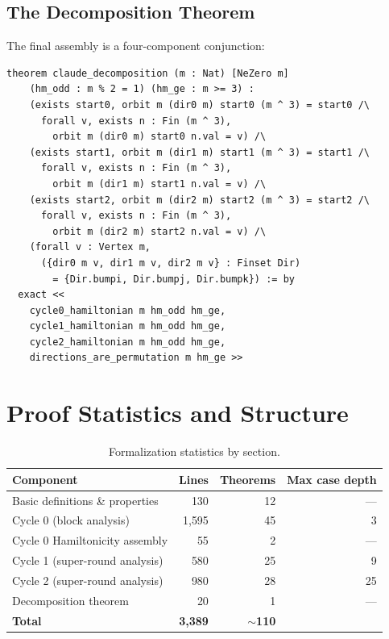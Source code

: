 \documentclass[11pt,a4paper]{article}
\begin{document}
\subsection{The Decomposition Theorem}

The final assembly is a four-component conjunction:

\begin{lstlisting}[caption={The main decomposition theorem}]
theorem claude_decomposition (m : Nat) [NeZero m]
    (hm_odd : m % 2 = 1) (hm_ge : m >= 3) :
    (exists start0, orbit m (dir0 m) start0 (m ^ 3) = start0 /\
      forall v, exists n : Fin (m ^ 3),
        orbit m (dir0 m) start0 n.val = v) /\
    (exists start1, orbit m (dir1 m) start1 (m ^ 3) = start1 /\
      forall v, exists n : Fin (m ^ 3),
        orbit m (dir1 m) start1 n.val = v) /\
    (exists start2, orbit m (dir2 m) start2 (m ^ 3) = start2 /\
      forall v, exists n : Fin (m ^ 3),
        orbit m (dir2 m) start2 n.val = v) /\
    (forall v : Vertex m,
      ({dir0 m v, dir1 m v, dir2 m v} : Finset Dir)
        = {Dir.bumpi, Dir.bumpj, Dir.bumpk}) := by
  exact <<
    cycle0_hamiltonian m hm_odd hm_ge,
    cycle1_hamiltonian m hm_odd hm_ge,
    cycle2_hamiltonian m hm_odd hm_ge,
    directions_are_permutation m hm_ge >>
\end{lstlisting}

\section{Proof Statistics and Structure}
\label{sec:stats}

\begin{table}[h]
\centering
\begin{tabular}{lrrr}
\toprule
\textbf{Component} & \textbf{Lines} & \textbf{Theorems} & \textbf{Max case depth} \\
\midrule
Basic definitions \& properties     & 130   & 12  & --- \\
Cycle 0 (block analysis)            & 1{,}595 & 45 & 3 \\
Cycle 0 Hamiltonicity assembly      & 55    & 2   & --- \\
Cycle 1 (super-round analysis)      & 580   & 25  & 9 \\
Cycle 2 (super-round analysis)      & 980   & 28  & 25 \\
Decomposition theorem               & 20    & 1   & --- \\
\midrule
\textbf{Total}                      & \textbf{3{,}389} & \textbf{$\sim$110} & \\
\bottomrule
\end{tabular}
\caption{Formalization statistics by section.}
\end{table}
\end{document}
